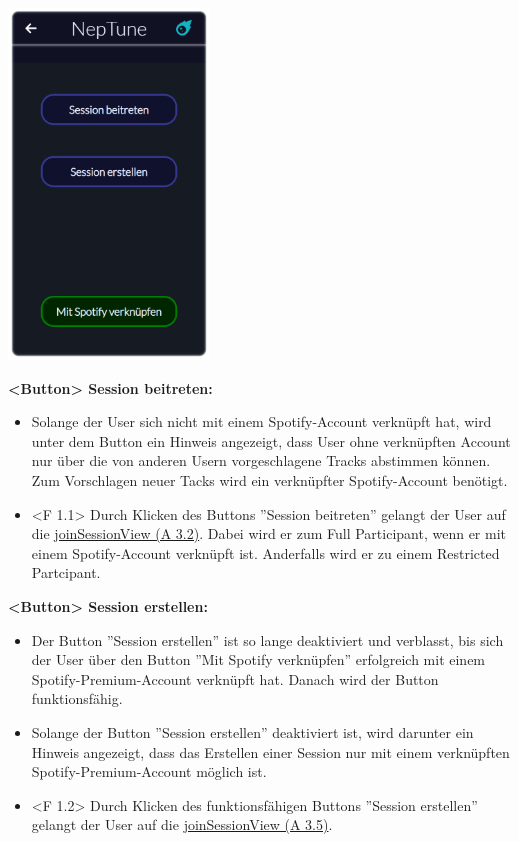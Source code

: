 \documentclass[oneside, ngerman]{sdqtechreport}
\begin{document}
\begin{center}
    \hypertarget{startView}{}
    \includegraphics[width=0.4\textwidth]{LATEX/Pflichtenheft/GraphicDesigns/startPage.png}
\end{center}

\textbf{<Button> Session beitreten:}
\begin{itemize}
    \item Solange der User sich nicht mit einem Spotify-Account verknüpft hat, wird unter dem Button ein Hinweis angezeigt, dass User ohne verknüpften Account nur über die von anderen Usern vorgeschlagene Tracks abstimmen können. Zum Vorschlagen neuer Tacks wird ein verknüpfter Spotify-Account benötigt.
    \hypertarget{<F 1.1>}{}
    \item <F 1.1> Durch Klicken des Buttons ''Session beitreten'' gelangt der User auf die \hyperlink{joinSessionView}{joinSessionView (A 3.2)}. Dabei wird er zum Full Participant, wenn er mit einem Spotify-Account verknüpft ist. Anderfalls wird er zu einem Restricted Partcipant.
\end{itemize}

\textbf{<Button> Session erstellen:}
\begin{itemize}
    \item Der Button ''Session erstellen'' ist so lange deaktiviert und verblasst, bis sich der User über den Button ''Mit Spotify verknüpfen'' erfolgreich mit einem Spotify-Premium-Account verknüpft hat. Danach wird der Button funktionsfähig.
    \item Solange der Button ''Session erstellen'' deaktiviert ist, wird darunter ein Hinweis angezeigt, dass das Erstellen einer Session nur mit einem verknüpften Spotify-Premium-Account möglich ist.
    \hypertarget{<F 1.2>}{}
    \item <F 1.2> Durch Klicken des funktionsfähigen Buttons ''Session erstellen'' gelangt der User auf die \hyperlink{joinSessionView}{joinSessionView (A 3.5)}.
\end{itemize}
\end{document}

